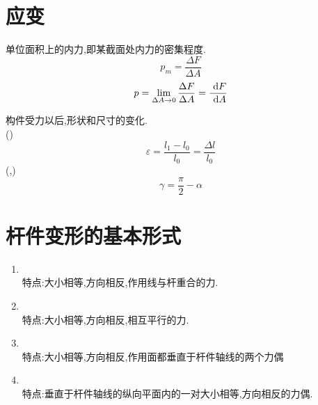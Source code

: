 \section{应变}
\vspace{-1.5em}
\begin{definition}[应力]
单位面积上的内力,即某截面处内力的密集程度.\\
\begin{equation}
	p_m = \frac{\Delta F}{\Delta A}
\end{equation}
\begin{equation}
	p = \lim\limits_{\Delta A \to 0}\frac{\Delta F}{\Delta A}=\frac{\, \, \text{d} F}{\, \, \text{d} A}
\end{equation}
\end{definition}

\begin{definition}[变形]
	构件受力以后,形状和尺寸的变化.
	\\
	()
	\begin{equation}
		\varepsilon = \frac{l_1-l_0}{l_0}=\frac{\Delta l}{l_0}
	\end{equation}
	(,)
	\begin{equation}
		\gamma = \frac{\pi}{2} - \alpha
	\end{equation}
\end{definition}

\section{杆件变形的基本形式}
\begin{enumerate}[]
	\item{}\\[0.5em]
	\hspace*{2em}特点:大小相等,方向相反,作用线与杆重合的力.
	\item{}\\[0.5em]
	\hspace*{2em}特点:大小相等,方向相反,相互平行的力.
	\item{}\\[0.5em]
	\hspace*{2em}特点:大小相等,方向相反,作用面都垂直于杆件轴线的两个力偶
	\item{}\\[0.5em]
	\hspace*{2em}特点:垂直于杆件轴线的纵向平面内的一对大小相等,方向相反的力偶.
\end{enumerate}


